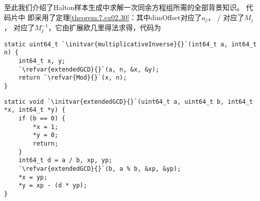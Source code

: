 至此我们介绍了Halton样本生成中求解一次同余方程组所需的全部背景知识。
代码片{}中
即采用了定理\ref{theorem:7.ex02.30}：其中{\ttfamily dimOffset}对应了$a_j$，
{\ttfamily{} / }对应了$M_j$，
{}对应了$M_j^{-1}$，它由扩展欧几里得法求得，代码为
\begin{lstlisting}
static uint64_t `\initvar{multiplicativeInverse}{}`(int64_t a, int64_t n) {
    int64_t x, y;
    `\refvar{extendedGCD}{}`(a, n, &x, &y);
    return `\refvar{Mod}{}`(x, n);
}
\end{lstlisting}
\begin{lstlisting}
static void `\initvar{extendedGCD}{}`(uint64_t a, uint64_t b, int64_t *x, int64_t *y) {
    if (b == 0) {
        *x = 1;
        *y = 0;
        return;
    }
    int64_t d = a / b, xp, yp;
    `\refvar{extendedGCD}{}`(b, a % b, &xp, &yp);
    *x = yp;
    *y = xp - (d * yp);
}
\end{lstlisting}
